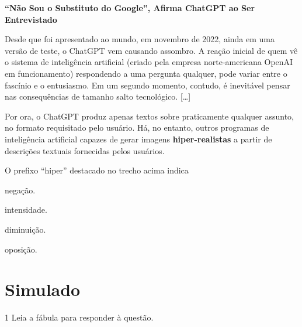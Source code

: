 \begin{myquote}
\textbf{``Não Sou o Substituto do Google'', Afirma ChatGPT ao Ser Entrevistado}

Desde que foi apresentado ao mundo, em novembro de 2022, ainda em uma
versão de teste, o ChatGPT vem causando assombro. A reação inicial de
quem vê o sistema de inteligência artificial (criado pela empresa
norte-americana OpenAI em funcionamento) respondendo a uma pergunta
qualquer, pode variar entre o fascínio e o entusiasmo. Em um segundo
momento, contudo, é inevitável pensar nas consequências de tamanho salto
tecnológico. {[}\ldots{}{]}

Por ora, o ChatGPT produz apenas textos sobre praticamente qualquer
assunto, no formato requisitado pelo usuário. Há, no entanto, outros
programas de inteligência artificial capazes de gerar imagens
\textbf{hiper-realistas} a partir de descrições textuais fornecidas pelos
usuários.

\end{myquote}

O prefixo ``hiper'' destacado no trecho acima indica

\begin{escolha}
  \item negação.

  \item intensidade.

  \item diminuição.

  \item oposição.
\end{escolha}
\pagebreak

\chapter[Simulado 2]{Simulado}

\vspace*{-1cm}

\num{1} Leia a fábula para responder à questão.

